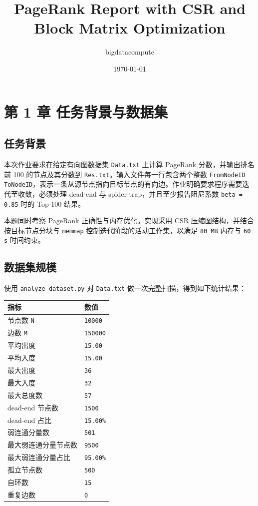 \documentclass[UTF8,a4paper,12pt]{ctexart}
\title{PageRank Report with CSR and Block Matrix Optimization}
\author{bigdatacompute}
\date{\today}
\begin{document}
\maketitle
\tableofcontents
\newpage

\section{第 1 章 任务背景与数据集}


\subsection{任务背景}


本次作业要求在给定有向图数据集 \texttt{Data.txt} 上计算 PageRank 分数，并输出排名前 100 的节点及其分数到 \texttt{Res.txt}。输入文件每一行包含两个整数 \texttt{FromNodeID ToNodeID}，表示一条从源节点指向目标节点的有向边。作业明确要求程序需要迭代至收敛，必须处理 dead-end 与 spider-trap，并且至少报告阻尼系数 \texttt{beta = 0.85} 时的 Top-100 结果。


本题同时考察 PageRank 正确性与内存优化。实现采用 CSR 压缩图结构，并结合按目标节点分块与 \texttt{memmap} 控制迭代阶段的活动工作集，以满足 \texttt{80 MB} 内存与 \texttt{60 s} 时间约束。


\subsection{数据集规模}


使用 \texttt{analyze\_dataset.py} 对 \texttt{Data.txt} 做一次完整扫描，得到如下统计结果：


\begin{center}
\small
\begin{tabularx}{\textwidth}{>{\raggedright\arraybackslash}X >{\raggedright\arraybackslash}X}
\toprule
指标 & 数值 \\
\midrule
节点数 \texttt{N} & \texttt{10000} \\
边数 \texttt{M} & \texttt{150000} \\
平均出度 & \texttt{15.00} \\
平均入度 & \texttt{15.00} \\
最大出度 & \texttt{36} \\
最大入度 & \texttt{32} \\
最大总度数 & \texttt{57} \\
dead-end 节点数 & \texttt{1500} \\
dead-end 占比 & \texttt{15.00\%} \\
弱连通分量数 & \texttt{501} \\
最大弱连通分量节点数 & \texttt{9500} \\
最大弱连通分量占比 & \texttt{95.00\%} \\
孤立节点数 & \texttt{500} \\
自环数 & \texttt{15} \\
重复边数 & \texttt{0} \\
\bottomrule
\end{tabularx}
\end{center}
\end{document}
